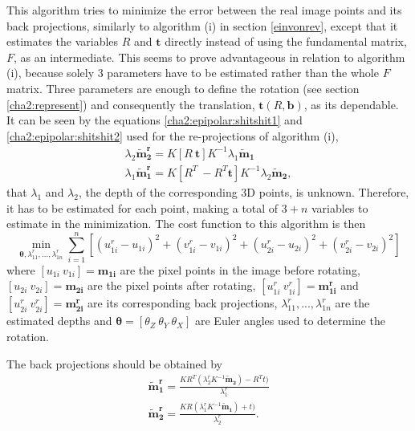 This algorithm tries to minimize the error between the real image points and its back projections, similarly to algorithm (i) in section \ref{einvonrev}, except that it estimates the variables $R$ and $\mathbf{t}$ directly instead of using the fundamental matrix, $F$, as an intermediate. This seems to prove advantageous in relation to algorithm (i), because solely 3 parameters have to be estimated rather than the whole $F$ matrix. Three parameters are enough to define the rotation (see section \ref{cha2:represent}) and consequently the translation, $\mathbf{t}(R, \mathbf{b})$, as its dependable.\\
It can be seen by the equations \ref{cha2:epipolar:shitshit1} and \ref{cha2:epipolar:shitshit2} used for the re-projections of algorithm (i),
\begin{align}
	\lambda_2 \mathbf{\tilde{m}^r_2} = K [ R \ \mathbf{t} ] K^{-1} \lambda_1 \mathbf{\tilde{m}_1}\\
	\lambda_1 \mathbf{\tilde{m}^r_1} =  K [ R^{T} \ -R^{T}\mathbf{t} ]K^{-1} \lambda_2 \mathbf{\tilde{m}_2},
\end{align}
that $\lambda_1$ and $\lambda_2$, the depth of the corresponding 3D points, is unknown. Therefore, it has to be estimated for each point, making a total of $3+n$ variables to estimate in the minimization.
The cost function to this algorithm is then
\begin{equation}
	\min_{\mathbf{\theta}, \lambda^r_{11}, ..., \lambda^r_{1n}} \sum^n_{i=1} [(u^r_{1i}-u_{1i})^2  + (v^r_{1i}-v_{1i})^2 + (u^r_{2i}-u_{2i})^2 + (v^r_{2i}-v_{2i})^2]
\end{equation}
where $[u_{1i} \ v_{1i}] = \mathbf{m_{1i}}$ are the pixel points in the image before rotating, $[u_{2i} \ v_{2i}] = \mathbf{m_{2i}}$ are the pixel points after rotating, $[u_{1i}^r \ v_{1i}^r] = \mathbf{m_{1i}^r}$ and $[u_{2i}^r \ v_{2i}^r] = \mathbf{m_{2i}^r}$ are its corresponding back projections, $\lambda^r_{11}, ..., \lambda^r_{1n}$ are the estimated depths and $\mathbf{\theta} = [\theta_Z \ \theta_Y \ \theta_X]$ are Euler angles used to determine the rotation.

The back projections should be obtained by
\begin{align*}
	\mathbf{\tilde{m}_{1}^r} = \frac{KR^T(\lambda_{2}^r K^{-1}\mathbf{\tilde{m}_2}) - R^Tt)}{\lambda_{1}^r}\\
	\mathbf{\tilde{m}_{2}^r} = \frac{KR(\lambda_{1}^r K^{-1}\mathbf{\tilde{m}_1}) + t)}{\lambda_{2}^r}.
\end{align*} 


